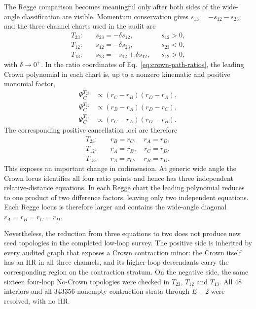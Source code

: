 \documentclass[a4paper,11pt]{article}
\begin{document}
The Regge comparison becomes meaningful only after both sides of the
wide-angle classification are visible.  Momentum conservation gives
\(s_{13}=-s_{12}-s_{23}\), and the three channel charts used in the audit are
\begin{align}
 T_{23}:&\quad s_{23}=-\delta s_{12}, &&s_{12}>0,\nonumber\\
 T_{12}:&\quad s_{12}=-\delta s_{23}, &&s_{23}<0,\nonumber\\
 T_{13}:&\quad s_{23}=-s_{12}+\delta s_{12}, &&s_{12}>0,
 \label{eq:crown-regge-charts}
\end{align}
with \(\delta\to0^+\).  In the ratio coordinates of
Eq.~\eqref{eq:crown-path-ratios}, the leading Crown polynomial in each chart
is, up to a nonzero kinematic and positive monomial factor,
\begin{align}
 \Psi_C^{T_{23}}&\propto(r_C-r_B)(r_D-r_A),\nonumber\\
 \Psi_C^{T_{12}}&\propto(r_B-r_A)(r_D-r_C),\nonumber\\
 \Psi_C^{T_{13}}&\propto(r_C-r_A)(r_D-r_B).
 \label{eq:crown-regge-ratio-factors}
\end{align}
The corresponding positive cancellation loci are therefore
\begin{align}
 T_{23}:&\quad r_B=r_C,\quad r_A=r_D,\nonumber\\
 T_{12}:&\quad r_A=r_B,\quad r_C=r_D,\nonumber\\
 T_{13}:&\quad r_A=r_C,\quad r_B=r_D.
 \label{eq:crown-regge-loci}
\end{align}
This exposes an important change in codimension.  At generic wide angle the
Crown locus identifies all four ratio points and hence has three independent
relative-distance equations.  In each Regge chart the leading polynomial
reduces to one product of two difference factors, leaving only two independent
equations.  Each Regge locus is therefore larger and contains the wide-angle diagonal
\(r_A=r_B=r_C=r_D\).

Nevertheless, the reduction from three equations to two does not produce
new seed topologies in the completed low-loop survey.  The positive side is
inherited by every audited graph that exposes a Crown contraction minor: the
Crown itself has an HR in all three channels, and its higher-loop descendants
carry the corresponding region on the contraction stratum.  On the negative
side, the same sixteen four-loop No-Crown topologies were checked in
\(T_{23}\), \(T_{12}\) and \(T_{13}\).  All 48 interiors and all 343356
nonempty contraction strata through \(E-2\) were resolved, with no HR.
\end{document}
